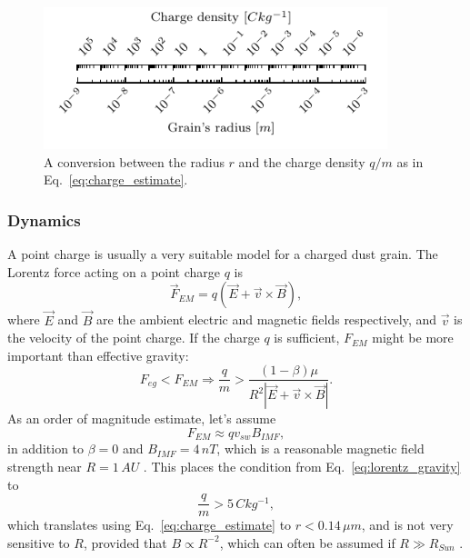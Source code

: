\begin{figure}[h]
 	\centering
 	\includegraphics[width=10cm]{figures/charge_density_ruler.pdf}
 	\caption{A conversion between the radius $r$ and the charge density $q/m$ as in Eq.~\ref{eq:charge_estimate}.}
 	\label{fig:charge_density_ruler}
\end{figure}

\subsubsection{Dynamics}

A point charge is usually a very suitable model for a charged dust grain. The Lorentz force acting on a point charge $q$ is
\begin{equation}
\vec{F}_{EM} = q \left( \vec{E} + \vec{v} \times \vec{B} \right),
\end{equation}
where $\vec{E}$ and $\vec{B}$ are the ambient electric and magnetic fields respectively, and $\vec{v}$ is the velocity of the point charge. If the charge $q$ is sufficient, $F_{EM}$ might be more important than effective gravity:
\begin{equation}
    F_{eg} < F_{EM} \Rightarrow \frac{q}{m} > \frac{(1-\beta)\mu}{R^2 \left| \vec{E} + \vec{v} \times \vec{B} \right|}. \label{eq:lorentz_gravity}
\end{equation}
As an order of magnitude estimate, let's assume 
\begin{equation}
    F_{EM} \approx q v_{sw} B_{IMF},
    \label{eq:EM_estimate}
\end{equation}
in addition to $\beta = 0$ and $B_{IMF} = 4 \, \si{nT}$, which is a reasonable magnetic field strength near $R = 1 \, \si{AU}$ \citep{mann2007nanoparticles}. This places the condition from Eq.~\ref{eq:lorentz_gravity} to
\begin{equation}
    \frac{q}{m} > 5 \, \si{C kg^{-1}},
\end{equation}
which translates using Eq.~\ref{eq:charge_estimate} to $r < 0.14 \, \si{\mu m}$, and is not very sensitive to $R$, provided that $B \propto R^{-2}$, which can often be assumed if $R \gg R_{Sun}$ \citep{parker1958dynamics}.  


